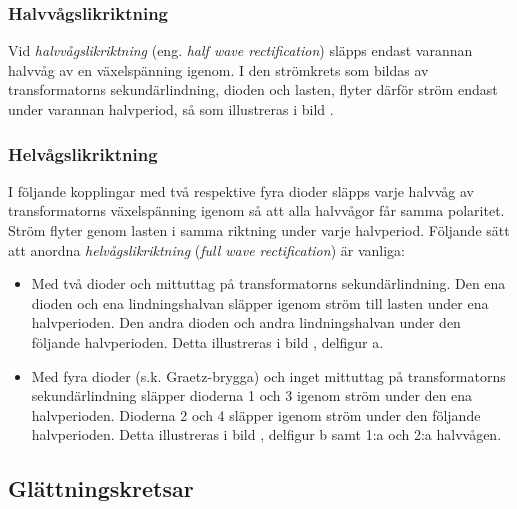 \newpage
{}

\subsubsection{Halvvågslikriktning}

Vid \emph{halvvågslikriktning} (eng. \emph{half wave rectification}) släpps endast
varannan halvvåg av en växelspänning igenom.
I den strömkrets som bildas av transformatorns sekundärlindning, dioden och
lasten, flyter därför ström endast under varannan halvperiod, så som
illustreras i bild .

\subsubsection{Helvågslikriktning}

I följande kopplingar med två respektive fyra dioder släpps varje halvvåg av
transformatorns växelspänning igenom så att alla halvvågor får samma polaritet.
Ström flyter genom lasten i samma riktning under varje halvperiod.
Följande sätt att anordna \emph{helvågslikriktning}
(\emph{full wave rectification}) är vanliga:
\begin{itemize}
\item Med två dioder och mittuttag på transformatorns sekundärlindning.
  Den ena dioden och ena lindningshalvan släpper igenom ström till lasten
  under ena halvperioden.
  Den andra dioden och andra lindningshalvan under den följande halvperioden.
  Detta illustreras i bild , delfigur a.

\item Med fyra dioder (s.k. Graetz-brygga) och inget mittuttag på
  transformatorns sekundärlindning släpper dioderna 1 och 3 igenom
  ström under den ena halvperioden.
  Dioderna 2 och 4 släpper igenom ström under den följande halvperioden.
  Detta illustreras i bild , delfigur b samt 1:a och 2:a
  halvvågen.
\end{itemize}

\subsection{Glättningskretsar}
\label{glättningskretsar}


